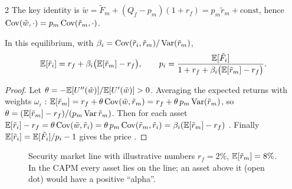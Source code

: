 \begin{paracol}{2}
The key identity is
$\tilde w=\tilde F_m+(Q_f-p_m)(1+r_f)=p_m\tilde r_m+\text{const}$, hence $\operatorname{Cov}(\tilde w,\cdot)=p_m\operatorname{Cov}(\tilde r_m,\cdot)$.

\begin{theorem}\label{ch03:thm-capm}
In this equilibrium, with $\beta_i=\operatorname{Cov}(\tilde r_i,\tilde r_m)/\operatorname{Var}(\tilde r_m)$,
\[
  \mathbb{E}[\tilde r_i]=r_f+\beta_i\bigl(\mathbb{E}[\tilde r_m]-r_f\bigr),\qquad
  p_i=\frac{\mathbb{E}[\tilde F_i]}{1+r_f+\beta_i\bigl(\mathbb{E}[\tilde r_m]-r_f\bigr)} .
\]
\end{theorem}
\begin{proof}
Let $\theta=-\mathbb{E}[U''(\tilde w)]/\mathbb{E}[U'(\tilde w)]>0$. Averaging the expected returns with weights $\omega_i$
: $\mathbb{E}[\tilde r_m]=r_f+\theta\operatorname{Cov}(\tilde w,\tilde r_m)=r_f+\theta\,p_m\operatorname{Var}(\tilde r_m)$, so
$\theta=(\mathbb{E}[\tilde r_m]-r_f)/(p_m\operatorname{Var}\tilde r_m)$. Then for each asset
$\mathbb{E}[\tilde r_i]-r_f=\theta\operatorname{Cov}(\tilde w,\tilde r_i)=\theta\,p_m\operatorname{Cov}(\tilde r_m,\tilde r_i)=\beta_i(\mathbb{E}[\tilde r_m]-r_f)$ . Finally
$\mathbb{E}[\tilde r_i]=\mathbb{E}[\tilde F_i]/p_i-1$ gives the price .
\end{proof}

\begin{figure}[ht]
\centering
{}
\caption{Security market line with illustrative numbers $r_f=2\%$, $\mathbb{E}[\tilde r_m]=8\%$. In the CAPM every asset lies
on the line; an asset above it (open dot) would have a positive ``alpha''.}\label{ch03:fig-sml}
\end{figure}


\end{paracol}
